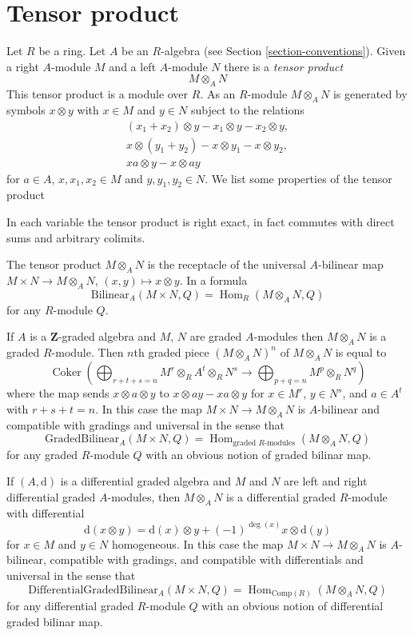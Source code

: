 \documentclass{stacks-project}
\theoremstyle{plain}
\theoremstyle{definition}
\theoremstyle{remark}
\numberwithin{equation}{subsection}
\def\Hom{\mathop{\mathrm{Hom}}\nolimits}
\def\Coker{\mathop{\mathrm{Coker}}}
\begin{document}
\section{Tensor product}
\label{section-tensor-product}

\noindent
Let $R$ be a ring. Let $A$ be an $R$-algebra (see
Section \ref{section-conventions}). Given a right $A$-module $M$
and a left $A$-module $N$ there is a {\it tensor product}
$$
M \otimes_A N
$$
This tensor product is a module over $R$. As an $R$-module $M \otimes_A N$
is generated by symbols $x \otimes y$ with $x \in M$ and $y \in N$ subject
to the relations
$$
\begin{matrix}
(x_1 + x_2) \otimes y - x_1 \otimes y - x_2 \otimes y, \\
x \otimes (y_1 + y_2) - x \otimes y_1 - x \otimes y_2, \\
xa \otimes y - x \otimes ay
\end{matrix}
$$
for $a \in A$, $x, x_1, x_2 \in M$ and $y, y_1, y_2 \in N$.
We list some properties of the tensor product

\medskip\noindent
In each variable the tensor product is right exact, in fact commutes
with direct sums and arbitrary colimits.

\medskip\noindent
The tensor product $M \otimes_A N$ is the receptacle of the universal
$A$-bilinear map $M \times N \to M \otimes_A N$, $(x, y) \mapsto x \otimes y$.
In a formula
$$
\text{Bilinear}_A(M \times N, Q) = \Hom_R(M \otimes_A N, Q)
$$
for any $R$-module $Q$.

\medskip\noindent
If $A$ is a $\mathbf{Z}$-graded algebra and $M$, $N$ are graded
$A$-modules then $M \otimes_A N$ is a graded $R$-module.
Then $n$th graded piece $(M \otimes_A N)^n$ of $M \otimes_A N$
is equal to
$$
\Coker\left(
\bigoplus\nolimits_{r + t + s = n}
M^r \otimes_R A^t \otimes_R N^s \to
\bigoplus\nolimits_{p + q = n} M^p \otimes_R N^q
\right)
$$
where the map sends $x \otimes a \otimes y$ to
$x \otimes ay - xa \otimes y$ for
$x \in M^r$, $y \in N^s$, and $a \in A^t$ with $r + s + t = n$.
In this case the map $M \times N \to M \otimes_A N$ is $A$-bilinear
and compatible with gradings and universal in the sense that
$$
\text{GradedBilinear}_A(M \times N, Q) =
\Hom_{\text{graded }R\text{-modules}}(M \otimes_A N, Q)
$$
for any graded $R$-module $Q$ with an obvious notion of graded
bilinar map.

\medskip\noindent
If $(A, \text{d})$ is a differential graded algebra and
$M$ and $N$ are left and right differential graded $A$-modules, then
$M \otimes_A N$ is a differential graded $R$-module with differential
$$
\text{d}(x \otimes y) =
\text{d}(x) \otimes y + (-1)^{\deg(x)}x \otimes \text{d}(y)
$$
for $x \in M$ and $y \in N$ homogeneous. In this case the map
$M \times N \to M \otimes_A N$ is $A$-bilinear, compatible with gradings,
and compatible with differentials and universal in the sense that
$$
\text{DifferentialGradedBilinear}_A(M \times N, Q) =
\Hom_{\text{Comp}(R)}(M \otimes_A N, Q)
$$
for any differential graded $R$-module $Q$ with an obvious notion of
differential graded bilinar map.
\end{document}
